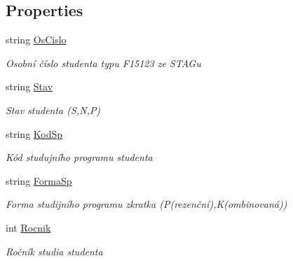 \subsection*{Properties}
\begin{DoxyCompactItemize}
\item 
string \hyperlink{class_analyza_rozvrhu_1_1_s_t_a_g___classes_1_1_student_ae576e3db3e67f9976802acbde8d5efdb}{Os\+Cislo}
\begin{DoxyCompactList}\small\item\em Osobní číslo studenta typu F15123 ze S\+T\+A\+Gu \end{DoxyCompactList}\item 
string \hyperlink{class_analyza_rozvrhu_1_1_s_t_a_g___classes_1_1_student_a4312a9928590c1d635224aa92a0221a1}{Stav}
\begin{DoxyCompactList}\small\item\em Stav studenta (S,N,P) \end{DoxyCompactList}\item 
string \hyperlink{class_analyza_rozvrhu_1_1_s_t_a_g___classes_1_1_student_aaa557f2538dc83ccda7b2ba86c7644e4}{Kod\+Sp}
\begin{DoxyCompactList}\small\item\em Kód studujního programu studenta \end{DoxyCompactList}\item 
string \hyperlink{class_analyza_rozvrhu_1_1_s_t_a_g___classes_1_1_student_a6384f45588e50eed500a039cbfa7239c}{Forma\+Sp}
\begin{DoxyCompactList}\small\item\em Forma studijního programu zkratka (P(rezenční),K(ombinovaná)) \end{DoxyCompactList}\item 
int \hyperlink{class_analyza_rozvrhu_1_1_s_t_a_g___classes_1_1_student_aceb456b2f0875cada2b44f5314e320cd}{Rocnik}
\begin{DoxyCompactList}\small\item\em Ročník studia studenta \end{DoxyCompactList}\item 

\end{DoxyCompactItemize}
